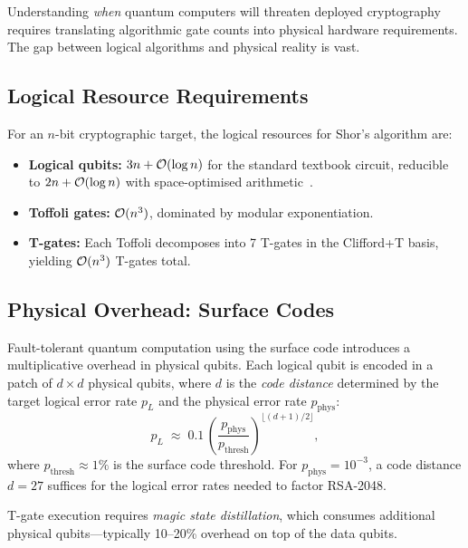 Understanding \emph{when} quantum computers will threaten deployed cryptography requires translating algorithmic gate counts into physical hardware requirements.  The gap between logical algorithms and physical reality is vast.

\subsection{Logical Resource Requirements}
\label{subsec:logical-resources}

For an $n$-bit cryptographic target, the logical resources for Shor's algorithm are:
\begin{itemize}
\item \textbf{Logical qubits:} $3n + \mathcal{O}(\log n)$ for the standard textbook circuit, reducible to $2n + \mathcal{O}(\log n)$ with space-optimised arithmetic~\cite{GidneyEkera2021}.
\item \textbf{Toffoli gates:} $\mathcal{O}(n^3)$, dominated by modular exponentiation.
\item \textbf{T-gates:} Each Toffoli decomposes into 7 T-gates in the Clifford+T basis, yielding $\mathcal{O}(n^3)$ T-gates total.
\end{itemize}


\subsection{Physical Overhead: Surface Codes}
\label{subsec:surface-codes}

Fault-tolerant quantum computation using the surface code introduces a multiplicative overhead in physical qubits.  Each logical qubit is encoded in a patch of $d \times d$ physical qubits, where $d$ is the \emph{code distance} determined by the target logical error rate $p_L$ and the physical error rate $p_\text{phys}$:
\begin{equation}
\label{eq:code-distance}
p_L \;\approx\; 0.1\,\left(\frac{p_\text{phys}}{p_\text{thresh}}\right)^{\lfloor(d+1)/2\rfloor},
\end{equation}
where $p_\text{thresh} \approx 1\%$ is the surface code threshold.  For $p_\text{phys} = 10^{-3}$, a code distance $d = 27$ suffices for the logical error rates needed to factor RSA-2048.

T-gate execution requires \emph{magic state distillation}, which consumes additional physical qubits---typically 10--20\% overhead on top of the data qubits.

